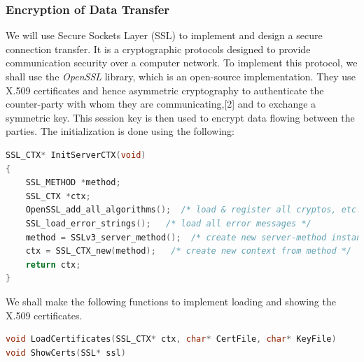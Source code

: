 \documentclass{article}
\begin{document}
				\subsubsection{Encryption of Data Transfer}
				We will use Secure Sockets Layer (SSL) to implement and design a secure connection transfer. It is a cryptographic protocols designed to provide communication security over a computer network. To implement this protocol, we shall use the \textit{OpenSSL} library, which is an open-source implementation. They use X.509 certificates and hence asymmetric cryptography to authenticate the counter-party with whom they are communicating,[2] and to exchange a symmetric key. This session key is then used to encrypt data flowing between the parties. 
				\newline
				The initialization is done using the following:
				\begin{lstlisting}[language=C++, caption={Initialization}]
SSL_CTX* InitServerCTX(void)
{   
	SSL_METHOD *method;
    SSL_CTX *ctx; 
    OpenSSL_add_all_algorithms();  /* load & register all cryptos, etc. */
    SSL_load_error_strings();   /* load all error messages */
    method = SSLv3_server_method();  /* create new server-method instance */
    ctx = SSL_CTX_new(method);   /* create new context from method */
    return ctx;
}
				\end{lstlisting}

				We shall make the following functions to implement loading and showing the X.509 certificates.

				\begin{lstlisting}[language=C++, caption={X.509 Certificates}]
void LoadCertificates(SSL_CTX* ctx, char* CertFile, char* KeyFile)
void ShowCerts(SSL* ssl)
				\end{lstlisting}
\end{document}
